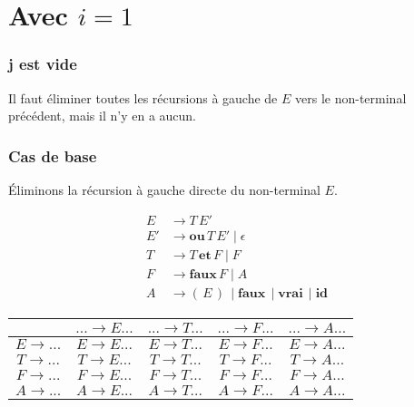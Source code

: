 \documentclass[class=article]{standalone}
\begin{document}
\section*{Avec $i = 1$}
\subsubsection*{j est vide}
Il faut éliminer toutes les récursions à gauche de $E$ vers le non-terminal précédent,
mais il n'y en a aucun.

\subsubsection*{Cas de base}
Éliminons la récursion à gauche directe du non-terminal $E$.

\begin{align*}
    E &\rightarrow T \, E'\\
    E'&\rightarrow \textbf{ou} \, T \, E' \mid \epsilon\\
    T &\rightarrow T \, \textbf{et} \, F \mid F\\
    F &\rightarrow \textbf{faux} \, F \mid A\\
    A &\rightarrow ( \, E \, ) \, \mid \textbf{faux} \, \mid \textbf{vrai} \, \mid \textbf{id}
\end{align*}
\begin{center}
    \begin{tabular}{c|c|c|c|c|}
        \cellcolor[HTML]{FFFFFF}                     & 
        \cellcolor[HTML]{FFFFFF} $... \rightarrow E...$ &
        \cellcolor[HTML]{FFFFFF} $... \rightarrow T...$ & 
        \cellcolor[HTML]{FFFFFF} $... \rightarrow F...$ & 
        \cellcolor[HTML]{FFFFFF} $... \rightarrow A...$ \\
    \hline
        \cellcolor[HTML]{FFFFFF} $E \rightarrow ...$ & 
        \cellcolor[HTML]{FF0000} $E \rightarrow E...$ & 
        \cellcolor[HTML]{ABFF00} $E \rightarrow T...$ & 
        \cellcolor[HTML]{ABFF00} $E \rightarrow F...$ & 
        \cellcolor[HTML]{ABFF00} $E \rightarrow A...$ \\
    \hline
        \cellcolor[HTML]{FFFFFF} $T \rightarrow ...$ & 
        \cellcolor[HTML]{FFFFFF} $T \rightarrow E...$ & 
        \cellcolor[HTML]{FFFFFF} $T \rightarrow T...$ & 
        \cellcolor[HTML]{ABFF00} $T \rightarrow F...$ &
        \cellcolor[HTML]{ABFF00} $T \rightarrow A...$ \\
    \hline
        \cellcolor[HTML]{FFFFFF} $F \rightarrow ...$ &
        \cellcolor[HTML]{FFFFFF} $F \rightarrow E...$ &
        \cellcolor[HTML]{FFFFFF} $F \rightarrow T...$ & 
        \cellcolor[HTML]{FFFFFF} $F \rightarrow F...$ & 
        \cellcolor[HTML]{ABFF00} $F \rightarrow A...$ \\
    \hline
        \cellcolor[HTML]{FFFFFF} $A \rightarrow ...$ & 
        \cellcolor[HTML]{FFFFFF} $A \rightarrow E...$ & 
        \cellcolor[HTML]{FFFFFF} $A \rightarrow T...$ & 
        \cellcolor[HTML]{FFFFFF} $A \rightarrow F...$ & 
        \cellcolor[HTML]{FFFFFF} $A \rightarrow A...$ \\
    \hline
    \end{tabular}
\end{center}
\end{document}
